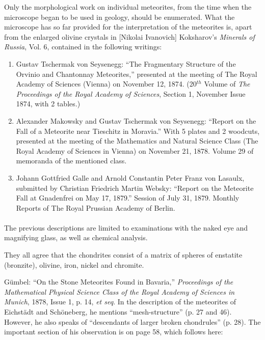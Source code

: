 \documentclass[a4paper, 12pt, oneside]{article}
\begin{document}
Only the morphological work on individual meteorites, from the time when the microscope began to be used in geology, should be enumerated. What the microscope has so far provided for the interpretation of the meteorites is, apart from the enlarged olivine crystals in [Nikolai Ivanovich] Koksharov's \emph{Minerals of Russia}, Vol. 6, contained in the following writings:
\begin{enumerate}
    \item Gustav Tschermak von Seysenegg: ``The Fragmentary Structure of the Orvinio and Chantonnay Meteorites,'' presented at the meeting of The Royal Academy of Sciences (Vienna) on November 12, 1874. (20$^{th}$ Volume of \emph{The Proceedings of the Royal Academy of Sciences}, Section 1, November Issue 1874, with 2 tables.)
    \item Alexander Makowsky and Gustav Tschermak von Seysenegg: ``Report on the Fall of a Meteorite near Tieschitz in Moravia.'' With 5 plates and 2 woodcuts, presented at the meeting of the Mathematics and Natural Science Class (The Royal Academy of Sciences in Vienna) on November 21, 1878. Volume 29 of memoranda of the mentioned class.
    \item Johann Gottfried Galle and Arnold Constantin Peter Franz von Lasaulx, submitted by Christian Friedrich Martin Websky: ``Report on the Meteorite Fall at Gnadenfrei on May 17, 1879.'' Session of July 31, 1879. Monthly Reports of The Royal Prussian Academy of Berlin.
\end{enumerate}
\paragraph*{}
The previous descriptions are limited to examinations with the naked eye and magnifying glass, as well as chemical analysis.

They all agree that the chondrites consist of a matrix of spheres of enstatite (bronzite), olivine, iron, nickel and chromite.

Gümbel: ``On the Stone Meteorites Found in Bavaria,'' \emph{Proceedings of the Mathematical Physical Science Class of the Royal Academy of Sciences in Munich}, 1878, Issue 1, p. 14, \emph{et seq}. In the description of the meteorites of Eichstädt and Schöneberg, he mentions ``mesh-structure'' (p. 27 and 46). However, he also speaks of ``descendants of larger broken chondrules'' (p. 28). The important section of his observation is on page 58, which follows here:
\end{document}
